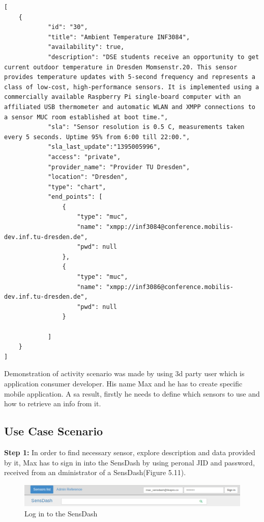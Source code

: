 	\begin{lstlisting}[label=sensor_registry,caption=JSON Description Format]
[
    {
            "id": "30",
            "title": "Ambient Temperature INF3084",
            "availability": true,
            "description": "DSE students receive an opportunity to get current outdoor temperature in Dresden Momsenstr.20. This sensor provides temperature updates with 5-second frequency and represents a class of low-cost, high-performance sensors. It is implemented using a commercially available Raspberry Pi single-board computer with an affiliated USB thermometer and automatic WLAN and XMPP connections to a sensor MUC room established at boot time.",
            "sla": "Sensor resolution is 0.5 C, measurements taken every 5 seconds. Uptime 95% from 6:00 till 22:00.",
            "sla_last_update":"1395005996",
            "access": "private",
            "provider_name": "Provider TU Dresden",
            "location": "Dresden",            
            "type": "chart",
            "end_points": [
                {
                    "type": "muc",
                    "name": "xmpp://inf3084@conference.mobilis-dev.inf.tu-dresden.de",
                    "pwd": null
                },
                {
                    "type": "muc",
                    "name": "xmpp://inf3086@conference.mobilis-dev.inf.tu-dresden.de",
                    "pwd": null
                }

            ]
    }
]
	\end{lstlisting}
Demonstration of activity scenario was made by using 3d party user which is application consumer developer. His name Max and he has to create specific mobile application. A sa result, firstly he needs to define which sensors to use and how to retrieve an info from it. 
\subsection{Use Case Scenario}

\textbf{Step 1:} In order to find necessary sensor, explore description and data provided by it, Max has to sign in into the SensDash by using peronal JID and password, received from an dministrator of a SensDash(Figure 5.11).
\begin{figure}[!ht]
\centering
\includegraphics[scale=0.6]{Screenshots/signIn.png}   
\caption[Log in to the SensDash]{Log in to the SensDash}                         
\end{figure}

